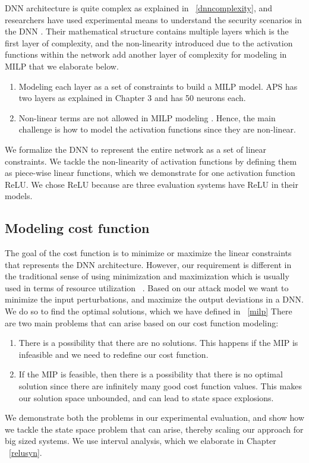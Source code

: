 DNN architecture is quite complex as explained in ~\ref{dnncomplexity}, and researchers have used experimental means to understand the security scenarios in the DNN . 
Their  mathematical structure contains multiple layers which is the first layer of complexity, and the non-linearity introduced due to the activation functions within the network add another layer of complexity for modeling in \ac{MILP}  that we elaborate below.

\begin{enumerate}
	\item Modeling each layer as a set of constraints to build a \ac{MILP} model.
	\ac{APS} has two layers as explained in Chapter 3 and has 50 neurons each. 
	\item Non-linear terms are not allowed in \ac{MILP} modeling . Hence, the main challenge is how to model the activation functions since they are non-linear. 
\end{enumerate}

We formalize the \ac{DNN} to represent the entire network as a set of linear constraints. 
We tackle the non-linearity of activation functions by defining them as piece-wise linear functions, 
which we demonstrate for one activation function ReLU.
We chose ReLU because are three evaluation systems have ReLU in their models. 

\subsection{Modeling cost function}
The goal of the cost function is to minimize or maximize the linear constraints that represents the \ac{DNN} architecture. 
However, our requirement is different in the traditional sense of using minimization and maximization which is usually used in terms of resource utilization ~\cite{7214162}.  
Based on our attack model we want to minimize the input perturbations, and maximize the output deviations in a \ac{DNN}.
We do so to find the optimal solutions, which we have defined in  ~\ref{milp}
There are two main problems that can arise based on our cost function modeling:
\begin{enumerate}
	\item There is a possibility that there are no solutions. 
	This happens if the \ac{MIP} is infeasible and we need to redefine our cost function. 
	\item If the \ac{MIP} is feasible, then there is a possibility that there is no optimal solution since there are infinitely many good cost function values. 
	This makes our solution space unbounded, and can lead to state space explosions. 
\end{enumerate}

We demonstrate both the problems in our experimental evaluation, 
and show how we tackle the state space problem that can arise, thereby scaling our approach for big sized systems. 
We use interval analysis, which we elaborate in Chapter ~\ref{relusyn}. 


















